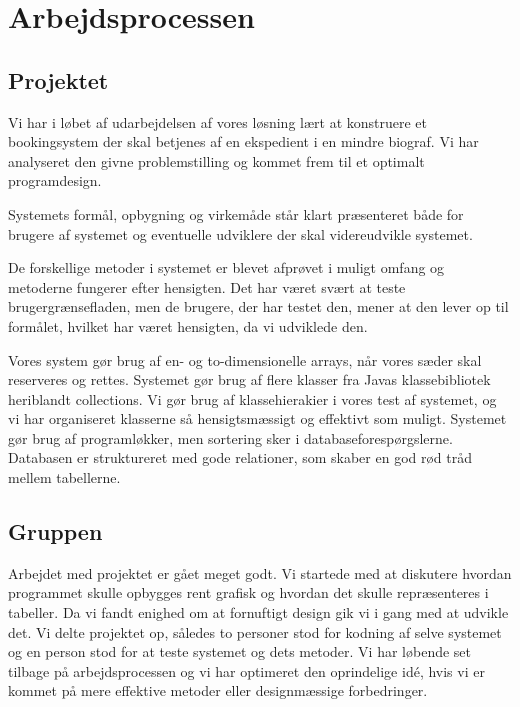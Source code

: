 \documentclass[final]{report}
\begin{document}
\chapter{Arbejdsprocessen}
\section{Projektet}
Vi har i løbet af udarbejdelsen af vores løsning lært at konstruere et bookingsystem der skal betjenes af en ekspedient i en mindre biograf. Vi har analyseret den givne problemstilling og kommet frem til et optimalt programdesign. 

Systemets formål, opbygning og virkemåde står klart præsenteret både for brugere af systemet og eventuelle udviklere der skal videreudvikle systemet. 

De forskellige metoder i systemet er blevet afprøvet i muligt omfang og metoderne fungerer efter hensigten. Det har været svært at teste brugergrænsefladen, men de brugere, der har testet den, mener at den lever op til formålet, hvilket har været hensigten, da vi udviklede den. 

Vores system gør brug af en- og to-dimensionelle arrays, når vores sæder skal reserveres og rettes. Systemet gør brug af flere klasser fra Javas klassebibliotek heriblandt collections. Vi gør brug af klassehierakier i vores test af systemet, og vi har organiseret klasserne så hensigtsmæssigt og effektivt som muligt. Systemet gør brug af programløkker, men sortering sker i databaseforespørgslerne. Databasen er struktureret med gode relationer, som skaber en god rød tråd mellem tabellerne. 

\section{Gruppen}
Arbejdet med projektet er gået meget godt. Vi startede med at diskutere hvordan programmet skulle opbygges rent grafisk og hvordan det skulle repræsenteres i tabeller. Da vi fandt enighed om at fornuftigt design gik vi i gang med at udvikle det. Vi delte projektet op, således to personer stod for kodning af selve systemet og en person stod for at teste systemet og dets metoder. Vi har løbende set tilbage på arbejdsprocessen og vi har optimeret den oprindelige idé, hvis vi er kommet på mere effektive metoder eller designmæssige forbedringer.
\end{document}
